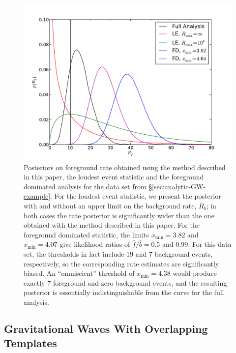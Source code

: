 \documentclass[aps,prd,reprint,nofootinbib]{revtex4-1}
\begin{document}
\begin{figure}
  \includegraphics[width=\columnwidth]{AltMethodComp}
  \caption{\label{fig:altmeth}Posteriors on foreground rate obtained
    using the method described in this paper, the loudest event
    statistic and the foreground dominated analysis for the data set
    from \S \ref{sec:analytic-GW-example}.  For the loudest event
    statistic, we present the posterior with and without an upper
    limit on the background rate, $R_b$; in both cases the rate
    posterior is significantly wider than the one obtained with the
    method described in this paper.  For the foreground dominated
    statistic, the limits $x_\mathrm{min} = 3.82$ and $x_\mathrm{min}
    = 4.07$ give likelihood ratios of $\hat{f}/\hat{b} = 0.5$ and
    $0.99$.  For this data set, the thresholds in fact include 19 and
    7 background events, respectively, so the corresponding rate
    estimates are significantly biased.  An ``omniscient'' threshold
    of $x_\mathrm{min} = 4.38$ would produce exactly 7 foreground and
    zero background events, and the resulting posterior is essentially
    indistinguishable from the curve for the full analysis.}
\end{figure}

\subsection{Gravitational Waves With Overlapping Templates}
\label{sec:gw-overlapping-template}
\end{document}
